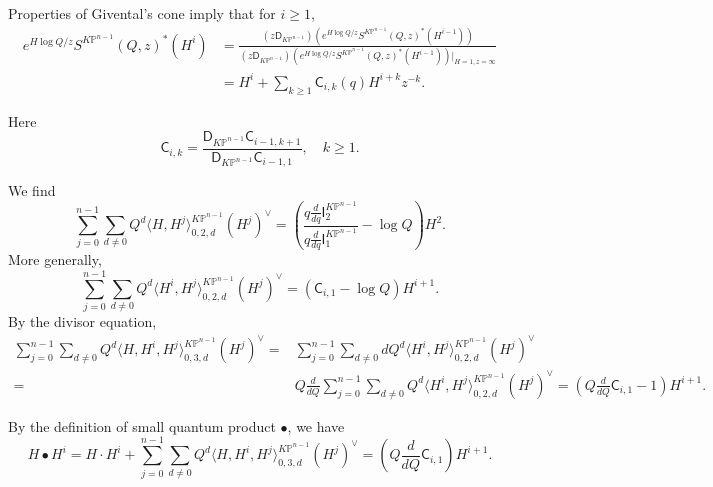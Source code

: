 \documentclass[12pt]{amsart}
\numberwithin{equation}{section}
\newcommand{\KP}{K\mathbb{P}}
\begin{document}
Properties of Givental's cone imply that for $i \geq 1$,
\begin{equation}\label{eqn:BFi_small}
\begin{split}
e^{H\log Q/z}S^{\KP^{n-1}}(Q, z)^*(H^i)&=\frac{\left(z\mathsf{D}_{K\mathbb{P}^{n-1}}\right)\left(e^{H\log Q/z}S^{\KP^{n-1}}(Q, z)^*(H^{i-1})\right)}{\left(z\mathsf{D}_{K\mathbb{P}^{n-1}}\right)\left(e^{H\log Q/z}S^{\KP^{n-1}}(Q, z)^*(H^{i-1})\right)\big|_{H=1,z=\infty}}\\
&=H^i+\sum_{k\geq 1} \mathsf{C}_{i,k}(q)H^{i+k}z^{-k}.
\end{split}
\end{equation}


Here
\begin{equation}\label{eqn:C_ik_inductive_relation}
\mathsf{C}_{i,k}=\frac{\mathsf{D}_{K\mathbb{P}^{n-1}}\mathsf{C}_{i-1,k+1}}{\mathsf{D}_{K\mathbb{P}^{n-1}}\mathsf{C}_{i-1,1}}, \quad k\geq 1.    
\end{equation}

We find 
\begin{equation}\label{eqn:2pt1_small}
\sum_{j=0}^{n-1}\sum_{d\neq 0}Q^d\langle H, H^j\rangle_{0,2,d}^{\KP^{n-1}}(H^j)^\vee=\left(\frac{q\frac{d}{dq}\mathsf{I}^{\KP^{n-1}}_2}{q\frac{d}{dq}\mathsf{I}^{\KP^{n-1}}_1} -\log Q\right) H^2. \end{equation}
More generally, 
\begin{equation}\label{eqn:2pti_small}
\sum_{j=0}^{n-1}\sum_{d\neq 0}Q^d\langle H^i, H^j\rangle_{0,2,d}^{\KP^{n-1}}(H^j)^\vee=\left(\mathsf{C}_{i,1} -\log Q\right) H^{i+1}.    
\end{equation}
By the divisor equation, 
\begin{equation*}
\begin{split}
\sum_{j=0}^{n-1}\sum_{d\neq 0}Q^d\langle H, H^i, H^j\rangle_{0,3,d}^{\KP^{n-1}}(H^j)^\vee
=&\sum_{j=0}^{n-1}\sum_{d\neq 0}dQ^d\langle H^i, H^j\rangle_{0,2,d}^{\KP^{n-1}}(H^j)^\vee\\
=&Q\frac{d}{dQ}\sum_{j=0}^{n-1}\sum_{d\neq 0}Q^d\langle H^i, H^j\rangle_{0,2,d}^{\KP^{n-1}}(H^j)^\vee=\left(Q\frac{d}{dQ}\mathsf{C}_{i,1}-1\right)H^{i+1}.
\end{split}
\end{equation*}

By the definition of small quantum product $\bullet$, we have 
\begin{equation*}
H\bullet H^i= H\cdot H^i+\sum_{j=0}^{n-1}\sum_{d\neq 0}Q^d\langle H, H^i, H^j\rangle_{0,3,d}^{\KP^{n-1}}(H^j)^\vee=  \left(Q\frac{d}{dQ}\mathsf{C}_{i,1}\right)H^{i+1}. \end{equation*}
\end{document}
